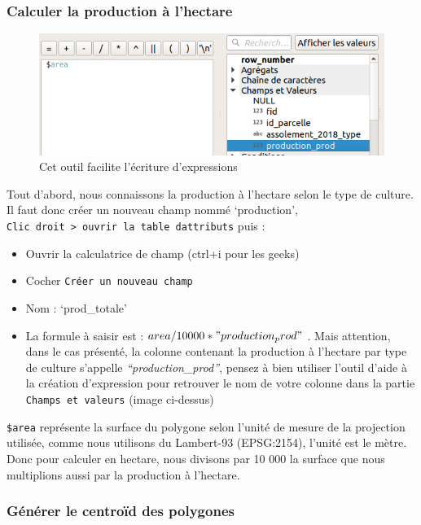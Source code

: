 \hypertarget{calculer-la-production-uxe0-lhectare}{%
\subsubsection{Calculer la production à
l'hectare}\label{calculer-la-production-uxe0-lhectare}}

\begin{figure}
\centering
\includegraphics{figures/ajout_champ_production.png}
\caption{Cet outil facilite l'écriture d'expressions}
\end{figure}

Tout d'abord, nous connaissons la production à l'hectare selon le type
de culture. Il faut donc créer un nouveau champ nommé `production',
\texttt{Clic\ droit\ \textgreater{}\ ouvrir\ la\ table\ d\textquotesingle{}attributs}
puis :

\begin{itemize}
\tightlist
\item
  Ouvrir la calculatrice de champ (ctrl+i pour les geeks)
\item
  Cocher \texttt{Créer\ un\ nouveau\ champ}
\item
  Nom : `prod\_totale'
\item
  La formule à saisir est : \(area/10000 * "production_prod"\) . Mais
  attention, dans le cas présenté, la colonne contenant la production à
  l'hectare par type de culture s'appelle \emph{``production\_prod''},
  pensez à bien utiliser l'outil d'aide à la création d'expression pour
  retrouver le nom de votre colonne dans la partie
  \texttt{Champs\ et\ valeurs} (image ci-dessus)
\end{itemize}

\texttt{\$area} représente la surface du polygone selon l'unité de
mesure de la projection utilisée, comme nous utilisons du Lambert-93
(EPSG:2154), l'unité est le mètre. Donc pour calculer en hectare, nous
divisons par 10 000 la surface que nous multiplions aussi par la
production à l'hectare.

\hypertarget{guxe9nuxe9rer-le-centrouxefd-des-polygones}{%
\subsubsection{Générer le centroïd des
polygones}\label{guxe9nuxe9rer-le-centrouxefd-des-polygones}}

